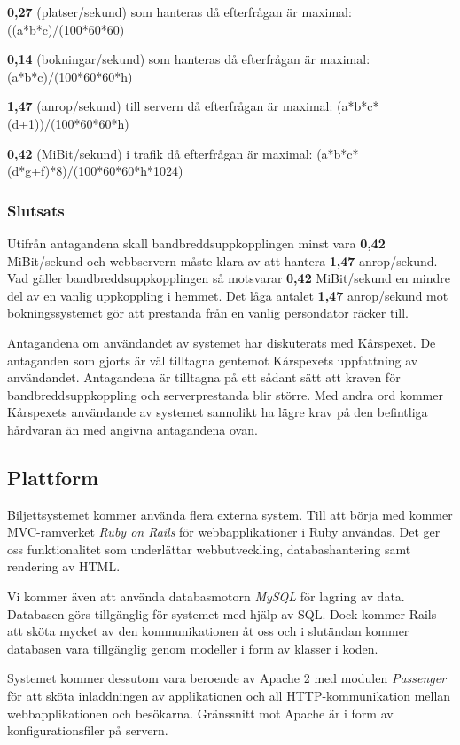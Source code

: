 \documentclass[a4paper, twoside, 11pt, titlepage]{article}
\begin{document}
		\textbf{0,27} (platser/sekund) som hanteras då efterfrågan är maximal: ((a*b*c)/(100*60*60)

		\textbf{0,14} (bokningar/sekund) som hanteras då efterfrågan är maximal: (a*b*c)/(100*60*60*h)

		\textbf{1,47} (anrop/sekund) till servern då efterfrågan är maximal: (a*b*c*(d+1))/(100*60*60*h)

		\textbf{0,42} (MiBit/sekund) i trafik då efterfrågan är maximal: (a*b*c*(d*g+f)*8)/(100*60*60*h*1024)

		\subsubsection{Slutsats}


		Utifrån antagandena skall bandbreddsuppkopplingen minst vara \textbf{0,42} MiBit/sekund och webbservern måste klara av att hantera \textbf{1,47} anrop/sekund. Vad gäller bandbreddsuppkopplingen så motsvarar \textbf{0,42} MiBit/sekund en mindre del av en vanlig uppkoppling i hemmet. Det låga antalet \textbf{1,47} anrop/sekund mot bokningssystemet gör att prestanda från en vanlig persondator räcker till.

		Antagandena om användandet av systemet har diskuterats med Kårspexet. De antaganden som gjorts är väl tilltagna gentemot Kårspexets uppfattning av användandet. Antagandena är tilltagna på ett sådant sätt att kraven för bandbreddsuppkoppling och serverprestanda blir större. Med andra ord kommer Kårspexets användande av systemet sannolikt ha lägre krav på den befintliga hårdvaran än med angivna antagandena ovan.

	\subsection{Plattform}


	Biljettsystemet kommer använda flera externa system. Till att börja med kommer MVC-ramverket \emph{Ruby on Rails} för webbapplikationer i Ruby användas. Det ger oss funktionalitet som underlättar webbutveckling, databashantering samt rendering av HTML.

	Vi kommer även att använda databasmotorn \emph{MySQL} för lagring av data. Databasen görs tillgänglig för systemet med hjälp av SQL. Dock kommer Rails att sköta mycket av den kommunikationen åt oss och i slutändan kommer databasen vara tillgänglig genom modeller i form av klasser i koden. 

	Systemet kommer dessutom vara beroende av Apache 2 med modulen \emph{Passenger} för att sköta inladdningen av applikationen och all HTTP-kommunikation mellan webbapplikationen och besökarna. Gränssnitt mot Apache är i form av konfigurationsfiler på servern. 
\end{document}

